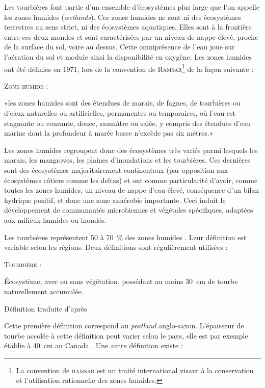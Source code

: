 Les tourbières font partie d'un ensemble d'écosystèmes plus large que l'on appelle les zones humides (\textit{wetlands}).
Ces zones humides ne sont ni des écosystèmes terrestres au sens strict, ni des écosystèmes aquatiques.
Elles sont à la frontière entre ces deux mondes et sont caractérisées par un niveau de nappe élevé, proche de la surface du sol, voire au dessus.
Cette omniprésence de l'eau joue sur l'aération du sol et module ainsi la disponibilité en oxygène.
Les zones humides ont été définies en 1971, lors de la convention de \textsc{Ramsar}\footnote{La convention de \textsc{ramsar} est un traité international visant à la conservation et l’utilisation rationnelle des zones humides.} de la façon suivante : 
\begin{pdef}
\textsc{Zone humide} :

«les zones humides sont des étendues de marais, de fagnes\footnotemark, de tourbières ou d'eaux naturelles ou artificielles, permanentes ou temporaires, où l'eau est stagnante ou courante, douce, saumâtre ou salée, y compris des étendues d'eau marine dont la profondeur à marée basse n'excède pas six mètres.»

\hfill {\scriptsize \citep{ramsar1987}}
\end{pdef}

Les zones humides regroupent donc des écosystèmes très variés parmi lesquels les marais, les mangroves, les plaines d'inondations et les tourbières.
Ces dernières sont des écosystèmes majoritairement continentaux (par opposition aux écosystèmes côtiers comme les deltas) et ont comme particularité d'avoir, comme toutes les zones humides, un niveau de nappe d'eau élevé, conséquence d'un bilan hydrique positif, et donc une zone anaérobie importante.
Ceci induit le développement de communautés microbiennes et végétales spécifiques, adaptées aux milieux humides ou inondés.


Les tourbières représentent 50 à \SI{70}{\percent} des zones humides \cite{joosten2002}.
Leur définition est variable selon les régions.
Deux définitions sont régulièrement utilisées :

\begin{pdef}
\textsc{Tourbière} :

Écosystème, avec ou sans végétation, possédant au moins \SI{30}{\cm} de tourbe naturellement accumulée.

\hfill {\scriptsize Définition traduite d'après \citet{joosten2002}}
\end{pdef}
Cette première définition correspond au \textit{peatland} anglo-saxon.
L'épaisseur de tourbe accolée à cette définition peut varier selon le pays, elle est par exemple établie à \SI{40}{\cm} au Canada \citep{nationalwetlandsworkinggroup1997}.
Une autre définition existe :


